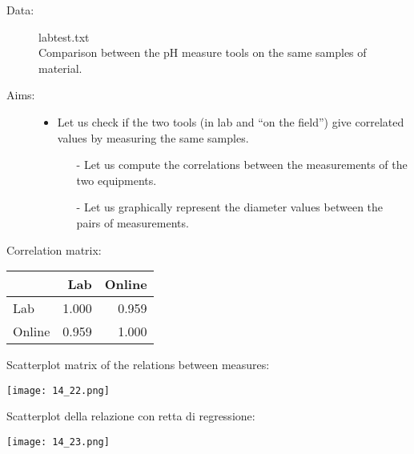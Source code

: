 \begin{frame} 
 
\begin{description}
	\item[Data:] labtest.txt\\ 
	Comparison between the pH measure tools on the same samples of material.
	\item[Aims:] \begin{small}\begin{itemize}
				\item Let us check if the two tools (in lab and ``on the field'') give correlated values by measuring the same samples.
				\begin{itemize}
					\item[-] Let us compute the correlations between the measurements of the two equipments.
					\item[-] Let us graphically represent the diameter values between the pairs of measurements.
				\end{itemize}
	                  \end{itemize}
\end{small}
\end{description}
 
\end{frame}

\begin{frame}
Correlation matrix:\\
\vspace{.3cm}
\begin{footnotesize}
\begin{tabular}{l|rr}
 & Lab & Online\\
\hline
Lab & 1.000 & 0.959\\
Online & 0.959 & 1.000\\
\end{tabular} 
\end{footnotesize}

Scatterplot matrix of the relations between measures:
\vspace{.3cm}
	\begin{center}
		\texttt{[image: 14\_22.png]}
	\end{center}
\end{frame}

\begin{frame}
Scatterplot della relazione con retta di regressione:\\
\vspace{.3cm}
	\begin{center}
		\texttt{[image: 14\_23.png]}
	\end{center}
\end{frame}

